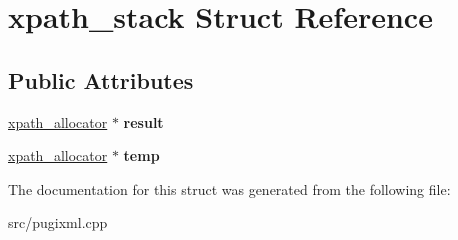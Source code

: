 \hypertarget{structxpath__stack}{}\section{xpath\+\_\+stack Struct Reference}
\label{structxpath__stack}
\subsection*{Public Attributes}
\begin{DoxyCompactItemize}
\item 
\mbox{\label{structxpath__stack_adce164b779cbb3d1bc093a772067ea7e}} 
\hyperlink{classxpath__allocator}{xpath\+\_\+allocator} $\ast$ {\bfseries result}
\item 
\mbox{\label{structxpath__stack_a48edd585dfb910c6c016559f07fea0d8}} 
\hyperlink{classxpath__allocator}{xpath\+\_\+allocator} $\ast$ {\bfseries temp}
\end{DoxyCompactItemize}


The documentation for this struct was generated from the following file\+:\begin{DoxyCompactItemize}
\item 
src/pugixml.\+cpp\end{DoxyCompactItemize}
